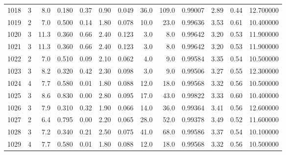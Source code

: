 \begin{tabular}{lrrrrrrrrrrrr}
1018 &        3 &            8.0 &             0.180 &         0.37 &            0.90 &      0.049 &                 36.0 &                 109.0 &  0.99007 &  2.89 &       0.44 &  12.700000 \\
1019 &        2 &            7.0 &             0.500 &         0.14 &            1.80 &      0.078 &                 10.0 &                  23.0 &  0.99636 &  3.53 &       0.61 &  10.400000 \\
1020 &        3 &           11.3 &             0.360 &         0.66 &            2.40 &      0.123 &                  3.0 &                   8.0 &  0.99642 &  3.20 &       0.53 &  11.900000 \\
1021 &        3 &           11.3 &             0.360 &         0.66 &            2.40 &      0.123 &                  3.0 &                   8.0 &  0.99642 &  3.20 &       0.53 &  11.900000 \\
1022 &        2 &            7.0 &             0.510 &         0.09 &            2.10 &      0.062 &                  4.0 &                   9.0 &  0.99584 &  3.35 &       0.54 &  10.500000 \\
1023 &        3 &            8.2 &             0.320 &         0.42 &            2.30 &      0.098 &                  3.0 &                   9.0 &  0.99506 &  3.27 &       0.55 &  12.300000 \\
1024 &        4 &            7.7 &             0.580 &         0.01 &            1.80 &      0.088 &                 12.0 &                  18.0 &  0.99568 &  3.32 &       0.56 &  10.500000 \\
1025 &        3 &            8.6 &             0.830 &         0.00 &            2.80 &      0.095 &                 17.0 &                  43.0 &  0.99822 &  3.33 &       0.60 &  10.400000 \\
1026 &        3 &            7.9 &             0.310 &         0.32 &            1.90 &      0.066 &                 14.0 &                  36.0 &  0.99364 &  3.41 &       0.56 &  12.600000 \\
1027 &        2 &            6.4 &             0.795 &         0.00 &            2.20 &      0.065 &                 28.0 &                  52.0 &  0.99378 &  3.49 &       0.52 &  11.600000 \\
1028 &        3 &            7.2 &             0.340 &         0.21 &            2.50 &      0.075 &                 41.0 &                  68.0 &  0.99586 &  3.37 &       0.54 &  10.100000 \\
1029 &        4 &            7.7 &             0.580 &         0.01 &            1.80 &      0.088 &                 12.0 &                  18.0 &  0.99568 &  3.32 &       0.56 &  10.500000 \\

\end{tabular}
